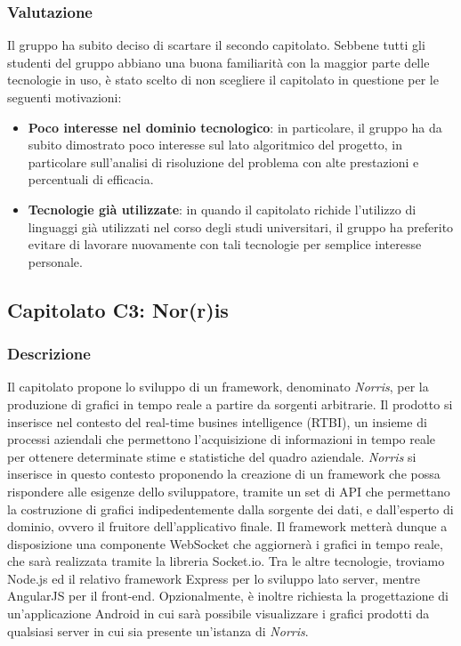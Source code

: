 \subsubsection{Valutazione}
Il gruppo ha subito deciso di scartare il secondo capitolato. Sebbene tutti gli studenti del gruppo abbiano una buona familiarità con la maggior parte delle tecnologie in uso, è stato scelto di non scegliere il capitolato in questione per le seguenti motivazioni:
\begin{itemize}
\item \textbf{Poco interesse nel dominio tecnologico}: in particolare, il gruppo ha da subito dimostrato poco interesse sul lato algoritmico del progetto, in particolare sull'analisi di risoluzione del problema con alte prestazioni e percentuali di efficacia.
\item \textbf{Tecnologie già utilizzate}: in quando il capitolato richide l'utilizzo di linguaggi già utilizzati nel corso degli studi universitari, il gruppo ha preferito evitare di lavorare nuovamente con tali tecnologie per semplice interesse personale.
\end{itemize}


\subsection{Capitolato C3: Nor(r)is}

\subsubsection{Descrizione}
Il capitolato propone lo sviluppo di un framework, denominato \emph{Norris}, per la produzione di grafici in tempo reale a partire da sorgenti arbitrarie. Il prodotto si inserisce nel contesto del real-time busines intelligence (RTBI), un insieme di processi aziendali che permettono l'acquisizione di informazioni in tempo reale per ottenere determinate stime e statistiche del quadro aziendale. \emph{Norris} si inserisce in questo contesto proponendo la creazione di un framework che possa rispondere alle esigenze dello sviluppatore, tramite un set di API che permettano la costruzione di grafici indipedentemente dalla sorgente dei dati, e dall'esperto di dominio, ovvero il fruitore dell'applicativo finale.
Il framework metterà dunque a disposizione una componente WebSocket che aggiornerà i grafici in tempo reale, che sarà realizzata tramite la libreria Socket.io. Tra le altre tecnologie, troviamo Node.js ed il relativo framework Express per lo sviluppo lato server, mentre AngularJS per il front-end. Opzionalmente, è inoltre richiesta la progettazione di un'applicazione Android in cui sarà possibile visualizzare i grafici prodotti da qualsiasi server in cui sia presente un'istanza di  \emph{Norris}.

